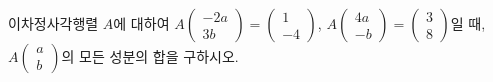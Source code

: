 \hspace*{2mm}\begin{minipage}[t]{\dimexpr\linewidth-2mm\relax}\vspace{0pt}
이차정사각행렬 $A$에 대하여 $A\begin{pmatrix} -2a \\ 3b \end{pmatrix}=\begin{pmatrix} 1 \\ -4 \end{pmatrix}$, $A\begin{pmatrix} 4a \\ -b \end{pmatrix}=\begin{pmatrix} 3 \\ 8 \end{pmatrix}$일 때, $A\begin{pmatrix} a \\ b \end{pmatrix}$의 모든 성분의 합을 구하시오. \end{minipage}
